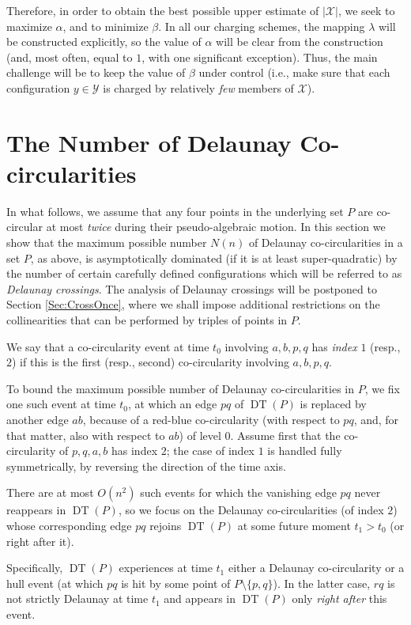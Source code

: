 \documentclass[letter,11pt]{article}
\def\X{\mathcal{X}}
\def\Y{\mathcal{Y}}
\def\DT{\mathop{\mathrm{DT}}}
\begin{document}
Therefore, in order to obtain the best possible upper estimate of $|\X|$, we seek to maximize $\alpha$, and to minimize 
$\beta$. 
In all our charging schemes, the mapping $\lambda$ will be constructed explicitly, so the value of $\alpha$ will be clear from the construction (and, most often, equal to $1$, with one significant exception). Thus, the main challenge will be to keep the value of $\beta$ under control (i.e., make sure that each configuration $y\in \Y$ is charged by relatively {\it few} members of $\X$).

\section{The Number of Delaunay Co-circularities}\label{Sec:DelCocircs}
In what follows, 
we assume that any four points in the underlying set $P$ are co-circular at most {\it twice} during their pseudo-algebraic motion. 
In this section we show that the maximum possible number $N(n)$ of Delaunay co-circularities in a set $P$, as above, is asymptotically dominated (if it is at least super-quadratic) by
the number of certain carefully defined configurations which will be referred to as {\it Delaunay crossings}. The analysis of Delaunay crossings will be postponed to Section \ref{Sec:CrossOnce}, where we shall impose additional restrictions on the collinearities that can be performed by triples of points in $P$.

\smallskip
{} We say that a co-circularity event at time $t_0$ involving $a,b,p,q$ has {\it index} $1$ (resp., $2$) if this is the first (resp., second) co-circularity involving $a,b,p,q$. 

\smallskip
To bound the maximum possible number of Delaunay co-circularities in $P$, we fix one such event at time $t_0$, at which an edge $pq$ of $\DT(P)$ is replaced by another edge $ab$, because of a red-blue co-circularity (with respect to $pq$, and, for that matter, also with respect to $ab$) of level $0$.
Assume first that the co-circularity of $p,q,a,b$ has index $2$; the case of index $1$ is handled fully symmetrically, by reversing the direction of the time axis.
 
There are at most $O(n^2)$ such events for which the vanishing edge $pq$ never reappears in $\DT(P)$, so we focus on the Delaunay co-circularities (of index $2$) whose corresponding edge $pq$ rejoins $\DT(P)$ at some future moment $t_1>t_0$ (or right after it).

Specifically, $\DT(P)$ experiences at time $t_1$ either a Delaunay co-circularity or a hull event (at which $pq$ is hit by some point of $P\setminus \{p,q\}$). In the latter case, $rq$ is not strictly Delaunay at time $t_1$ and appears in $\DT(P)$ only {\it right after} this event. 
\end{document}
